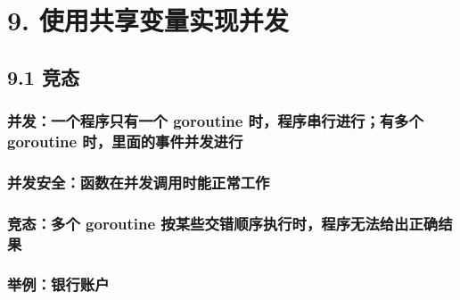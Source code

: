 \hypertarget{ux4f7fux7528ux5171ux4eabux53d8ux91cfux5b9eux73b0ux5e76ux53d1}{%
\section{9.
使用共享变量实现并发}\label{ux4f7fux7528ux5171ux4eabux53d8ux91cfux5b9eux73b0ux5e76ux53d1}}

\hypertarget{ux7adeux6001}{%
\subsection{9.1 竞态}\label{ux7adeux6001}}

\hypertarget{ux5e76ux53d1ux4e00ux4e2aux7a0bux5e8fux53eaux6709ux4e00ux4e2a-goroutine-ux65f6ux7a0bux5e8fux4e32ux884cux8fdbux884cux6709ux591aux4e2a-goroutine-ux65f6ux91ccux9762ux7684ux4e8bux4ef6ux5e76ux53d1ux8fdbux884c}{%
\subsubsection{并发：一个程序只有一个 goroutine 时，程序串行进行；有多个
goroutine
时，里面的事件并发进行}\label{ux5e76ux53d1ux4e00ux4e2aux7a0bux5e8fux53eaux6709ux4e00ux4e2a-goroutine-ux65f6ux7a0bux5e8fux4e32ux884cux8fdbux884cux6709ux591aux4e2a-goroutine-ux65f6ux91ccux9762ux7684ux4e8bux4ef6ux5e76ux53d1ux8fdbux884c}}

\hypertarget{ux5e76ux53d1ux5b89ux5168ux51fdux6570ux5728ux5e76ux53d1ux8c03ux7528ux65f6ux80fdux6b63ux5e38ux5de5ux4f5c}{%
\subsubsection{并发安全：函数在并发调用时能正常工作}\label{ux5e76ux53d1ux5b89ux5168ux51fdux6570ux5728ux5e76ux53d1ux8c03ux7528ux65f6ux80fdux6b63ux5e38ux5de5ux4f5c}}

\hypertarget{ux7adeux6001ux591aux4e2a-goroutine-ux6309ux67d0ux4e9bux4ea4ux9519ux987aux5e8fux6267ux884cux65f6ux7a0bux5e8fux65e0ux6cd5ux7ed9ux51faux6b63ux786eux7ed3ux679c}{%
\subsubsection{竞态：多个 goroutine
按某些交错顺序执行时，程序无法给出正确结果}\label{ux7adeux6001ux591aux4e2a-goroutine-ux6309ux67d0ux4e9bux4ea4ux9519ux987aux5e8fux6267ux884cux65f6ux7a0bux5e8fux65e0ux6cd5ux7ed9ux51faux6b63ux786eux7ed3ux679c}}

\hypertarget{ux4e3eux4f8bux94f6ux884cux8d26ux6237}{%
\subsubsection{举例：银行账户}\label{ux4e3eux4f8bux94f6ux884cux8d26ux6237}}

